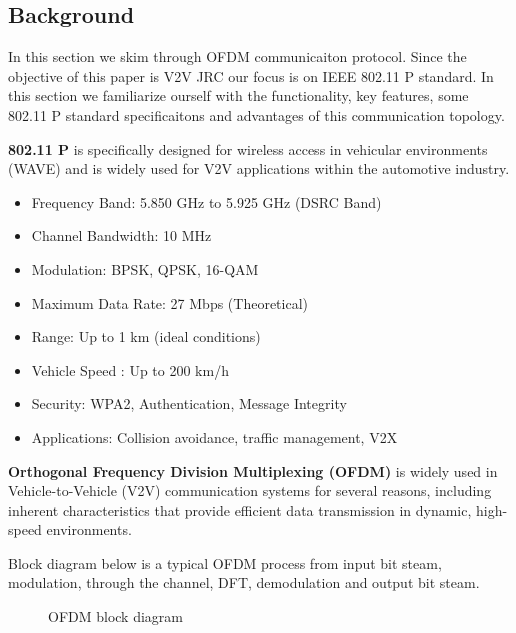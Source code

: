 \documentclass[conference]{IEEEtran}
\begin{document}
\begin{enumerate}
	 \subsection {Background}
 
 
            In this section we skim through OFDM communicaiton protocol. Since the objective of this paper is V2V JRC our focus is on IEEE 802.11 P standard. In this section we familiarize ourself with the functionality, key features, some 802.11 P standard specificaitons and advantages of this communication topology.\par
    \textbf{  802.11 P} is specifically designed for wireless access in vehicular environments (WAVE) and is widely used for V2V applications within the automotive industry.
      
      \begin{itemize}
      \item Frequency Band:		5.850 GHz to 5.925 GHz (DSRC Band)
	\item Channel Bandwidth:	10 MHz
	\item Modulation:		BPSK, QPSK, 16-QAM
	\item Maximum Data Rate:	27 Mbps (Theoretical)
	\item Range: 			Up to 1 km (ideal conditions)
	\item Vehicle Speed :                Up to 200 km/h
	\item Security:			WPA2, Authentication, Message Integrity
	\item Applications:		Collision avoidance, traffic management, V2X
	\end{itemize}
	
 \textbf{ Orthogonal Frequency Division Multiplexing (OFDM)} is widely used in Vehicle-to-Vehicle (V2V) communication systems for several reasons, including inherent characteristics that provide efficient data transmission in dynamic, high-speed environments.

Block diagram below is a typical OFDM process from input bit steam, modulation, through the channel, DFT, demodulation and output bit steam. 

		\begin{figure}[H]
	    		\centering
	    		\caption{OFDM block diagram}
		\end{figure}
      

\end{enumerate}
\end{document}
